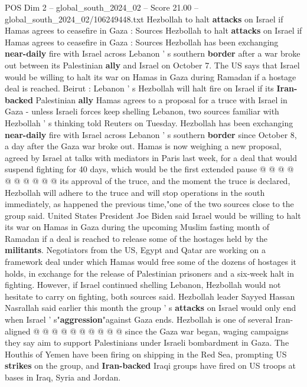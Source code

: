\begin{textsample}{POS Dim 2 – global\_south\_2024\_02 – Score 21.00 – global\_south\_2024\_02/106249448.txt}  \label{ex:f2_pos_192}
Hezbollah to halt \textbf{attacks} on Israel if Hamas agrees to ceasefire in Gaza : Sources Hezbollah to halt \textbf{attacks} on Israel if Hamas agrees to ceasefire in Gaza : Sources Hezbollah has been exchanging \textbf{near-daily} fire with Israel across Lebanon ' s southern \textbf{border} after a war broke out between its Palestinian \textbf{ally} and Israel on October 7.
The US says that Israel would be willing to halt its war on Hamas in Gaza during Ramadan if a hostage deal is reached.
Beirut : Lebanon ' s Hezbollah will halt fire on Israel if its \textbf{Iran-backed} Palestinian \textbf{ally} Hamas agrees to a proposal for a truce with Israel in Gaza - unless Israeli forces keep shelling Lebanon, two sources familiar with Hezbollah ' s thinking told Reuters on Tuesday.
Hezbollah has been exchanging \textbf{near-daily} fire with Israel across Lebanon ' s southern \textbf{border} since October 8, a day after the Gaza war broke out.
Hamas is now weighing a new proposal, agreed by Israel at talks with mediators in Paris last week, for a deal that would suspend fighting for 40 days, which would be the first extended pause @ @ @ @ @ @ @ @ @ @ its approval of the truce, and the moment the truce is declared, Hezbollah will adhere to the truce and will stop operations in the south immediately, as happened the previous time,"one of the two sources close to the group said.
United States President Joe Biden said Israel would be willing to halt its war on Hamas in Gaza during the upcoming Muslim fasting month of Ramadan if a deal is reached to release some of the hostages held by the \textbf{militants}.
Negotiators from the US, Egypt and Qatar are working on a framework deal under which Hamas would free some of the dozens of hostages it holds, in exchange for the release of Palestinian prisoners and a six-week halt in fighting.
However, if Israel continued shelling Lebanon, Hezbollah would not hesitate to carry on fighting, both sources said.
Hezbollah leader Sayyed Hassan Nasrallah said earlier this month the group ' s \textbf{attacks} on Israel would only end when Israel ' s"\textbf{aggression}"against Gaza ends.
Hezbollah is one of several Iran-aligned @ @ @ @ @ @ @ @ @ @ since the Gaza war began, waging campaigns they say aim to support Palestinians under Israeli bombardment in Gaza.
The Houthis of Yemen have been firing on shipping in the Red Sea, prompting US \textbf{strikes} on the group, and \textbf{Iran-backed} Iraqi groups have fired on US troops at bases in Iraq, Syria and Jordan.

\end{textsample}
